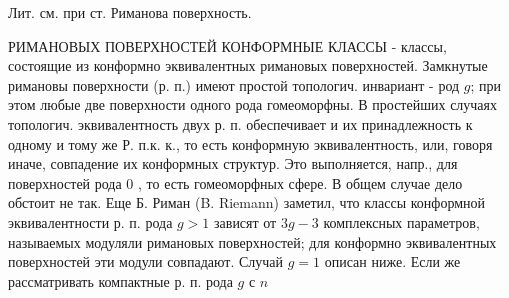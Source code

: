\documentclass[10pt]{article}
\begin{document}
Лит. см. при ст. Риманова поверхность.



РИМАНОВЫХ ПОВЕРХНОСТЕЙ КОНФОРМНЫЕ КЛАССЫ - классы, состоящие из конформно эквивалентных римановых поверхностей. Замкнутые римановы поверхности (р. п.) имеют простой топологич. инвариант - род $g$; при этом любые две поверхности одного рода гомеоморфны. В простейших случаях топологич. эквивалентность двух р. п. обеспечивает и их принадлежность к одному и тому же Р. п.к. к., то есть конформную эквивалентность, или, говоря иначе, совпадение их конформных структур. Это выполняется, напр., для поверхностей рода 0 , то есть гомеоморфных сфере. В общем случае дело обстоит не так. Еще Б. Риман (B. Riemann) заметил, что классы конформной эквивалентности р. п. рода $g>1$ зависят от $3 g-3$ комплексных параметров, называемых модуляли римановых поверхностей; для конформно эквивалентных поверхностей эти модули совпадают. Случай $g=1$ описан ниже. Если же рассматривать компактные р. п. рода $g$ с $n$
\end{document}
